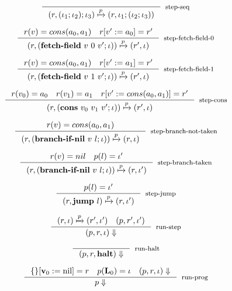 \documentclass[sigconf]{acmart}
\theoremstyle{definition}
\begin{document}
\begin{equation}
\inference{}
          {(r, (\iota_1;\iota_2);\iota_3) \xmapsto{p} (r, \iota_1;(\iota_2;\iota_3))}[step-seq]
\end{equation}

\begin{equation}
\inference{r(v) = cons(a_0,a_1)~~~r[v':=a_0]=r'}
          {(r, (\textbf{fetch-field}~v~0~v';\iota)) \xmapsto{p} (r', \iota)}[step-fetch-field-0]
\end{equation}

\begin{equation}
\inference{r(v) = cons(a_0,a_1)~~~r[v':=a_1]=r'}
          {(r, (\textbf{fetch-field}~v~1~v';\iota)) \xmapsto{p} (r', \iota)}[step-fetch-field-1]
\end{equation}

\begin{equation}
\inference{r(v_0) = a_0~~~r(v_1)=a_1~~~r[v':=cons(a_0,a_1)]=r'}
          {(r, (\textbf{cons}~v_0~v_1~v';\iota)) \xmapsto{p} (r', \iota)}[step-cons]
\end{equation}

\begin{equation}
\inference{r(v) = cons(a_0,a_1)}
          {(r, (\textbf{branch-if-nil}~v~l;\iota)) \xmapsto{p} (r, \iota)}[step-branch-not-taken]
\end{equation}

\begin{equation}
\inference{r(v) = nil~~~p(l)=\iota'}
          {(r, (\textbf{branch-if-nil}~v~l;\iota)) \xmapsto{p} (r, \iota')}[step-branch-taken]
\end{equation}

\begin{equation}
\inference{p(l)=\iota'}
          {(r, \textbf{jump}~l) \xmapsto{p} (r, \iota')}[step-jump]
\end{equation}

\begin{equation}
\inference{(r, \iota) \xmapsto{p} (r', \iota')~~~(p, r', \iota')}
          {(p, r, \iota) \Downarrow}[run-step]
\end{equation}

\begin{equation}
\inference{}
          {(p, r, \textbf{halt}) \Downarrow}[run-halt]
\end{equation}

\begin{equation}
\inference{\{\}[\textbf{v}_0:=\text{nil}]=r~~~p(\textbf{L}_0)=\iota~~~(p,r,\iota)\Downarrow}
          {p \Downarrow}[run-prog]
\end{equation}
\end{document}
